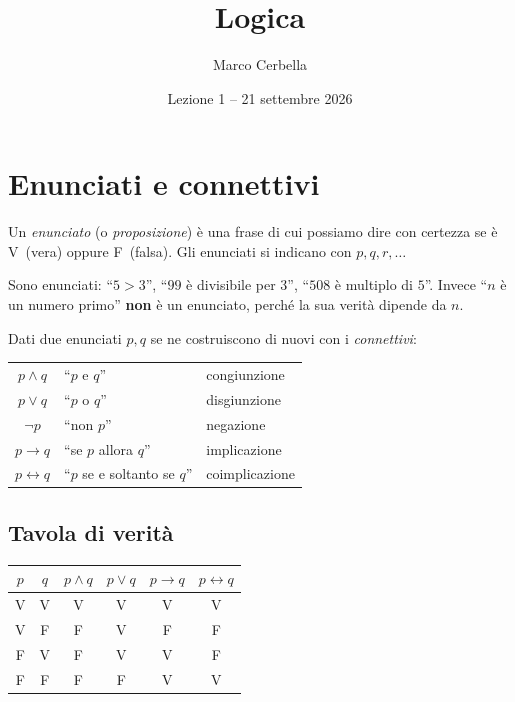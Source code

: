 \documentclass[11pt,a4paper]{article}
\title{Logica}
\author{Marco Cerbella}
\date{Lezione 1 -- 21 settembre 2026}
\newcommand{\V}{\textsf{V}}
\newcommand{\F}{\textsf{F}}
\begin{document}
\maketitle

\section{Enunciati e connettivi}

\begin{definizione}
Un \emph{enunciato} (o \emph{proposizione}) è una frase di cui possiamo
dire con certezza se è \V\ (vera) oppure \F\ (falsa). Gli enunciati si
indicano con $p, q, r, \dots$
\end{definizione}

\begin{esempio}
Sono enunciati: ``$5 > 3$'', ``$99$ è divisibile per $3$'',
``$508$ è multiplo di $5$''. Invece ``$n$ è un numero primo'' \textbf{non}
è un enunciato, perché la sua verità dipende da $n$.
\end{esempio}

Dati due enunciati $p, q$ se ne costruiscono di nuovi con i
\emph{connettivi}:
\begin{center}
\begin{tabular}{cll}
$p \land q$ & ``$p$ e $q$'' & congiunzione \\
$p \lor q$ & ``$p$ o $q$'' & disgiunzione \\
$\neg p$ & ``non $p$'' & negazione \\
$p \to q$ & ``se $p$ allora $q$'' & implicazione \\
$p \leftrightarrow q$ & ``$p$ se e soltanto se $q$'' & coimplicazione
\end{tabular}
\end{center}

\subsection*{Tavola di verità}

\begin{center}
\begin{tabular}{cc|c|c|c|c}
$p$ & $q$ & $p \land q$ & $p \lor q$ & $p \to q$ & $p \leftrightarrow q$ \\ \hline
\V & \V & \V & \V & \V & \V \\
\V & \F & \F & \V & \F & \F \\
\F & \V & \F & \V & \V & \F \\
\F & \F & \F & \F & \V & \V
\end{tabular}
\end{center}
\end{document}
